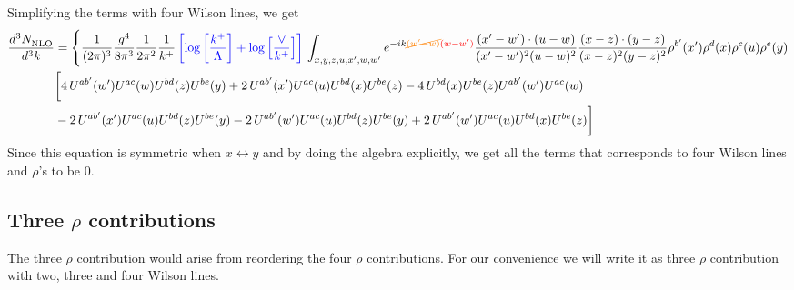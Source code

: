 \documentclass[aps,prd,amsmath,amssymb,nofootinbib]{revtex4-2}
\numberwithin{equation}{section}
\begin{document}
Simplifying the terms with four Wilson lines, we get
\begin{align}
       \frac{d^{3}N_{\rm NLO}^{\rm}}{d^{3}k}  & =  \Bigg\{\frac{1}{(2\pi)^{3}}\frac{g^{4}}{8\pi^{3}}\frac{1}{2\pi^{2}} \frac{1}{k^{+}}\,{\color{blue}\left[\log{\left[\frac{k^{+}}{\Lambda}\right]}+\log{\left[\frac{\vee}{k^{+}}\right]}\right]}\,\int_{x,y,z,u,x^{\prime},w,w^{\prime}}e^{-ik{\color{orange}\cancel{(w^{\prime}-w)}}{\color{red}(w-w^{\prime})}}\frac{(x^{\prime}-w^{\prime})\cdot (u-w)}{(x^{\prime}-w^{\prime})^{2} (u-w)^{2}} \frac{(x-z)\cdot (y-z)}{(x-z)^{2}(y-z)^{2}}\rho^{b'}(x') \rho^{d}(x) \rho^{c}(u) \rho^{e}(y)\notag \\ & \bigg[4\,U^{ab'}(w')U^{ac}(w)U^{bd}(z)U^{be}(y)+2\,U^{ab'}(x')U^{ac}(u)U^{bd}(x)U^{be}(z)-4\,U^{bd}(x)U^{be}(z)U^{ab'}(w')U^{ac}(w)\notag \\ & -2\,U^{ab'}(x')U^{ac}(u)U^{bd}(z)U^{be}(y)-2\,U^{ab'}(w')U^{ac}(u)U^{bd}(z)U^{be}(y)+2\,U^{ab'}(w')U^{ac}(u)U^{bd}(x)U^{be}(z)\bigg]
\end{align}
Since this equation is symmetric when $x\leftrightarrow y$ and by doing the algebra explicitly, we get all the terms that corresponds to four Wilson lines and $\rho$'s to be $0$.
\subsection{Three $\rho$ contributions }
The three $\rho$ contribution would arise from reordering the four $\rho$ contributions. For our convenience we will write it as three $\rho$ contribution with two, three and four Wilson lines. 
\end{document}
